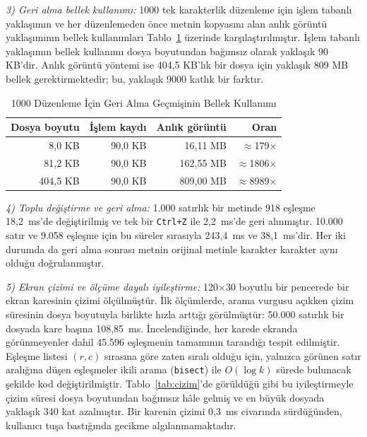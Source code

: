 \documentclass[conference,a4paper]{IEEEtran}
\newcommand{\kod}[1]{\texttt{#1}}
\begin{document}
\textit{3) Geri alma bellek kullanımı:} 1000 tek karakterlik düzenleme için işlem tabanlı yaklaşımın ve her düzenlemeden önce metnin kopyasını alan anlık görüntü yaklaşımının bellek kullanımları Tablo~\ref{tab:bellek} üzerinde karşılaştırılmıştır. İşlem tabanlı yaklaşımın bellek kullanımı dosya boyutundan bağımsız olarak yaklaşık 90 KB'dir. Anlık görüntü yöntemi ise 404,5 KB'lık bir dosya için yaklaşık 809 MB bellek gerektirmektedir; bu, yaklaşık 9000 katlık bir farktır.

\begin{table}[t]
\centering
\caption{1000 Düzenleme İçin Geri Alma Geçmişinin Bellek Kullanımı}
\label{tab:bellek}
\begin{tabular}{@{}rrrr@{}}
\toprule
\textbf{Dosya boyutu} & \textbf{İşlem kaydı} & \textbf{Anlık görüntü} & \textbf{Oran} \\
\midrule
8,0 KB & 90,0 KB & 16,11 MB & $\approx$179$\times$ \\
81,2 KB & 90,0 KB & 162,55 MB & $\approx$1806$\times$ \\
404,5 KB & 90,0 KB & 809,00 MB & $\approx$8989$\times$ \\
\bottomrule
\end{tabular}
\end{table}

\textit{4) Toplu değiştirme ve geri alma:} 1.000 satırlık bir metinde 918 eşleşme 18,2~ms'de değiştirilmiş ve tek bir \kod{Ctrl+Z} ile 2,2~ms'de geri alınmıştır. 10.000 satır ve 9.058 eşleşme için bu süreler sırasıyla 243,4~ms ve 38,1~ms'dir. Her iki durumda da geri alma sonrası metnin orijinal metinle karakter karakter aynı olduğu doğrulanmıştır.

\textit{5) Ekran çizimi ve ölçüme dayalı iyileştirme:} 120$\times$30 boyutlu bir pencerede bir ekran karesinin çizimi ölçülmüştür. İlk ölçümlerde, arama vurgusu açıkken çizim süresinin dosya boyutuyla birlikte hızla arttığı görülmüştür: 50.000 satırlık bir dosyada kare başına 108,85~ms. İncelendiğinde, her karede ekranda görünmeyenler dahil 45.596 eşleşmenin tamamının tarandığı tespit edilmiştir. Eşleşme listesi $(r,c)$ sırasına göre zaten sıralı olduğu için, yalnızca görünen satır aralığına düşen eşleşmeler ikili arama (\kod{bisect}) ile $O(\log k)$ sürede bulunacak şekilde kod değiştirilmiştir. Tablo~\ref{tab:cizim}'de görüldüğü gibi bu iyileştirmeyle çizim süresi dosya boyutundan bağımsız hâle gelmiş ve en büyük dosyada yaklaşık 340 kat azalmıştır. Bir karenin çizimi 0,3~ms civarında sürdüğünden, kullanıcı tuşa bastığında gecikme algılanmamaktadır.
\end{document}
